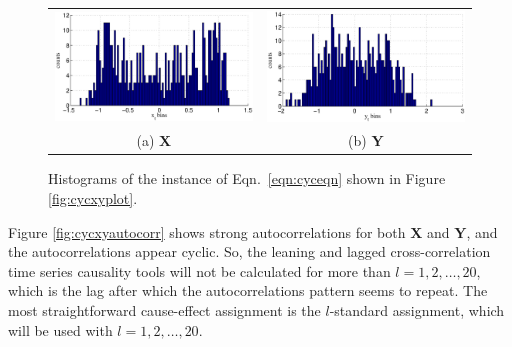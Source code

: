 \begin{figure}[ht]
\begin{tabular}{cc}
\includegraphics[scale=0.5]{NoisyCyclicResponseExample_Xhist.eps} & \includegraphics[scale=0.5]{NoisyCyclicResponseExample_Yhist.eps} \\
(a) $\mathbf{X}$ & (b) $\mathbf{Y}$
\end{tabular}
\caption{Histograms of the instance of Eqn.\ \ref{eqn:cyceqn} shown in Figure \ref{fig:cycxyplot}.}
\label{fig:cycxyhist}
\end{figure}

Figure \ref{fig:cycxyautocorr} shows strong autocorrelations for both $\mathbf{X}$ and $\mathbf{Y}$, and the autocorrelations appear cyclic.  So, the leaning and lagged cross-correlation time series causality tools will not be calculated for more than $l=1,2,\ldots,20$, which is the lag after which the autocorrelations pattern seems to repeat.  The most straightforward cause-effect assignment is the $l$-standard assignment, which will be used with $l = 1,2,\ldots,20$. 

